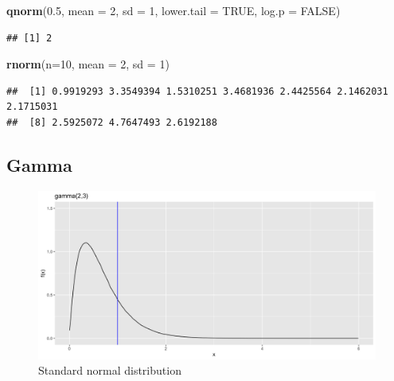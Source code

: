 \documentclass[]{book}
\newenvironment{Shaded}{\begin{snugshade}}{\end{snugshade}}
\newcommand{\DataTypeTok}[1]{\textcolor[rgb]{0.13,0.29,0.53}{#1}}
\newcommand{\DecValTok}[1]{\textcolor[rgb]{0.00,0.00,0.81}{#1}}
\newcommand{\FloatTok}[1]{\textcolor[rgb]{0.00,0.00,0.81}{#1}}
\newcommand{\KeywordTok}[1]{\textcolor[rgb]{0.13,0.29,0.53}{\textbf{#1}}}
\newcommand{\NormalTok}[1]{#1}
\newcommand{\OtherTok}[1]{\textcolor[rgb]{0.56,0.35,0.01}{#1}}
\begin{document}
\begin{Shaded}
\begin{Highlighting}[]
\KeywordTok{qnorm}\NormalTok{(}\FloatTok{0.5}\NormalTok{, }\DataTypeTok{mean =} \DecValTok{2}\NormalTok{, }\DataTypeTok{sd =} \DecValTok{1}\NormalTok{, }\DataTypeTok{lower.tail =} \OtherTok{TRUE}\NormalTok{, }\DataTypeTok{log.p =} \OtherTok{FALSE}\NormalTok{)}
\end{Highlighting}
\end{Shaded}

\begin{verbatim}
## [1] 2
\end{verbatim}

\begin{Shaded}
\begin{Highlighting}[]
\KeywordTok{rnorm}\NormalTok{(}\DataTypeTok{n=}\DecValTok{10}\NormalTok{, }\DataTypeTok{mean =} \DecValTok{2}\NormalTok{, }\DataTypeTok{sd =} \DecValTok{1}\NormalTok{)}
\end{Highlighting}
\end{Shaded}

\begin{verbatim}
##  [1] 0.9919293 3.3549394 1.5310251 3.4681936 2.4425564 2.1462031 2.1715031
##  [8] 2.5925072 4.7647493 2.6192188
\end{verbatim}

\hypertarget{gamma}{%
\subsection{Gamma}\label{gamma}}

\begin{figure}

{\centering \includegraphics{figure/gamma-1} 

}

\caption{Standard normal distribution}\label{fig:gamma}
\end{figure}
\end{document}
